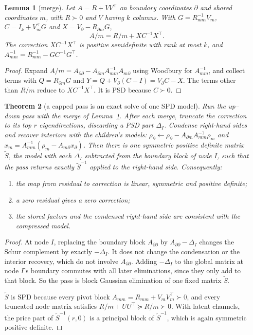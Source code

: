 \documentclass[11pt]{article}
\theoremstyle{plain}
\newtheorem{theorem}{Theorem}[section]
\newtheorem{lemma}[theorem]{Lemma}
\theoremstyle{definition}
\theoremstyle{remark}
\begin{document}
\begin{lemma}[merge]\label{lem:merge}
Let $A=R+VV^\top$ on boundary coordinates $\partial$ and shared coordinates $m$, with $R\succ0$ and $V$ having $k$ columns. With $G=R_{mm}^{-1}V_m$, $C=I_k+V_m^\top G$ and $X=V_\partial-R_{\partial m}G$,
\[
A/m=R/m+XC^{-1}X^\top .
\]
The correction $XC^{-1}X^\top$ is positive semidefinite with rank at most $k$, and $A_{mm}^{-1}=R_{mm}^{-1}-GC^{-1}G^\top$.
\end{lemma}
\begin{proof}
Expand $A/m=A_{\partial\partial}-A_{\partial m}A_{mm}^{-1}A_{m\partial}$ using Woodbury for $A_{mm}^{-1}$, and collect terms with $Q=R_{\partial m}G$ and $Y=Q+V_\partial(C-I)=V_\partial C-X$. The terms other than $R/m$ reduce to $XC^{-1}X^\top$. It is PSD because $C\succ0$.
\end{proof}

\begin{theorem}[a capped pass is an exact solve of one SPD model]\label{thm:consistent}
Run the up--down pass with the merge of Lemma~\ref{lem:merge}. After each merge, truncate the correction to its top $r$ eigendirections, discarding a PSD part $\Delta_I$. Condense right-hand sides and recover interiors with the children's models: $\rho_\partial\leftarrow\rho_\partial-A_{\partial m}A_{mm}^{-1}\rho_m$ and $x_m=A_{mm}^{-1}(\rho_m-A_{m\partial}x_\partial)$. Then there is one symmetric positive definite matrix $\tilde S$, the model with each $\Delta_I$ subtracted from the boundary block of node $I$, such that the pass returns exactly $\tilde S^{-1}$ applied to the right-hand side. Consequently:
\begin{enumerate}[label=(\roman*),leftmargin=1.6em]
  \item the map from residual to correction is linear, symmetric and positive definite;
  \item a zero residual gives a zero correction;
  \item the stored factors and the condensed right-hand side are consistent with the compressed model.
\end{enumerate}
\end{theorem}
\begin{proof}
At node $I$, replacing the boundary block $A_{\partial\partial}$ by $A_{\partial\partial}-\Delta_I$ changes the Schur complement by exactly $-\Delta_I$. It does not change the condensation or the interior recovery, which do not involve $A_{\partial\partial}$. Adding $-\Delta_I$ to the global matrix at node $I$'s boundary commutes with all later eliminations, since they only add to that block. So the pass is block Gaussian elimination of one fixed matrix $\tilde S$.

$\tilde S$ is SPD because every pivot block $A_{mm}=R_{mm}+V_mV_m^\top\succ0$, and every truncated node matrix satisfies $R/m+U U^\top\succeq R/m\succ0$. With latent channels, the price part of $\tilde S^{-1}(r,0)$ is a principal block of $\tilde S^{-1}$, which is again symmetric positive definite.
\end{proof}
\end{document}
